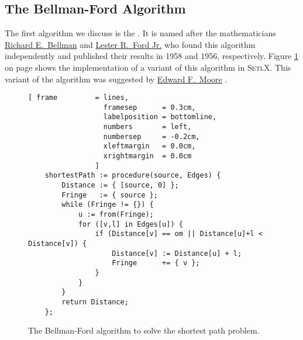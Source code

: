 \subsection{The Bellman-Ford Algorithm}
The first algorithm we discuss is the
\href{https://en.wikipedia.org/wiki/Bellman-Ford_algorithm}{}.
It is named after the mathematicians 
\href{https://en.wikipedia.org/wiki/Richard_E._Bellman}{Richard E.~Bellman} \cite{bellman:58} and 
\href{https://en.wikipedia.org/wiki/L._R._Ford_Jr.}{Lester R.~Ford Jr.} \cite{ford:56} who found this algorithm
independently and published their results in 1958 and 1956, respectively.  Figure
\ref{fig:moore.stlx} on page \pageref{fig:moore.stlx} shows the implementation of a variant of this 
algorithm in \textsc{SetlX}.  This variant of the algorithm was suggested by 
\href{https://en.wikipedia.org/wiki/Edward_F._Moore}{Edward F.~Moore} \cite{moore:59}.


\begin{figure}[!ht]
  \centering
\begin{Verbatim}[ frame         = lines, 
                  framesep      = 0.3cm, 
                  labelposition = bottomline,
                  numbers       = left,
                  numbersep     = -0.2cm,
                  xleftmargin   = 0.0cm,
                  xrightmargin  = 0.0cm
                ]
    shortestPath := procedure(source, Edges) {
        Distance := { [source, 0] };
        Fringe   := { source };
        while (Fringe != {}) {
            u := from(Fringe);
            for ([v,l] in Edges[u]) {
                if (Distance[v] == om || Distance[u]+l < Distance[v]) {
                    Distance[v] := Distance[u] + l;
                    Fringe      += { v };
                }
            }
        }
        return Distance;
    };
\end{Verbatim}
\vspace*{-0.3cm}
  \caption{The Bellman-Ford algorithm to solve the shortest path problem.}
  \label{fig:moore.stlx}
\end{figure} 


